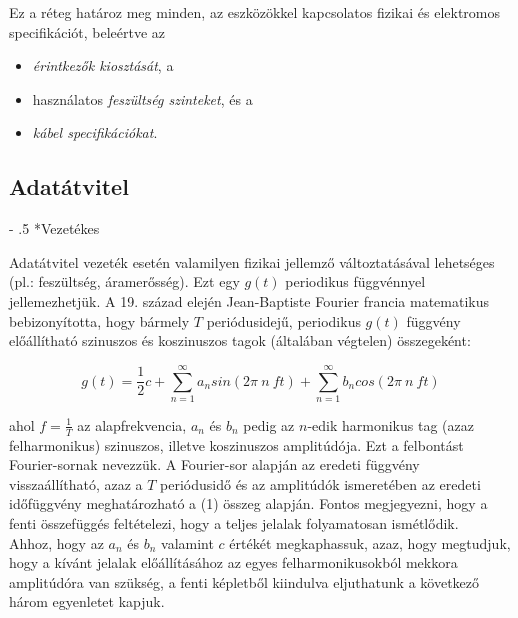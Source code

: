 \documentclass[12pt]{article}
\makeatletter
\renewcommand\paragraph{%
	\@startsection{paragraph}{4}{0mm}%
	{-\baselineskip}%
	{.5\baselineskip}%
	{\normalfont\normalsize\bfseries}}
\makeatother
\begin{document}
    \noindent Ez a réteg határoz meg minden, az eszközökkel kapcsolatos fizikai és elektromos specifikációt, beleértve az
    \begin{itemize}[leftmargin=7.5mm]
        \renewcommand{\labelitemi}{$\vcenter{\hbox{\tiny$\bullet$}}$}
        \item \emph{érintkezők kiosztását}, a
        \item használatos \emph{feszültség szinteket}, és a
        \item \emph{kábel specifikációkat}.
    \end{itemize}

	\subsection*{Adatátvitel\\}

	\paragraph*{Vezetékes}

    Adatátvitel vezeték esetén valamilyen fizikai jellemző változtatásával lehetséges (pl.: feszültség, áramerősség). Ezt egy $g(t)$ periodikus függvénnyel jellemezhetjük.
    A 19. század elején Jean-Baptiste Fourier francia matematikus bebizonyította, hogy bármely $T$ periódusidejű, periodikus $g(t)$ függvény előállítható szinuszos és koszinuszos tagok (általában végtelen) összegeként:
    \begin{mycapequ}[!ht]
    \label{ref:fourier}
        \begin{equation}
   		   g(t) = \frac{1}{2}c+ \sum\limits_{n=1}^\infty a_nsin(2\pi\ n\ f t) + \sum\limits_{n=1}^\infty b_ncos(2\pi\ n\ f t)
        \end{equation}
    \end{mycapequ}
			
    \noindent ahol $f=\frac{1}{T}$ az alapfrekvencia, $a_n$ és $b_n$ pedig az $n$-edik harmonikus tag (azaz felharmonikus) szinuszos, illetve koszinuszos amplitúdója. Ezt a felbontást Fourier-sornak nevezzük. A Fourier-sor alapján az eredeti függvény visszaállítható, azaz a $T$ periódusidő és az amplitúdók ismeretében az eredeti időfüggvény meghatározható a (1) összeg alapján. Fontos megjegyezni, hogy a fenti összefüggés feltételezi, hogy a teljes jelalak folyamatosan ismétlődik.\\
	
    \noindent Ahhoz,  hogy  az $a_n$ és $b_n$ valamint $c$ értékét  megkaphassuk,  azaz,  hogy  megtudjuk,  hogy  a kívánt   jelalak   előállításához   az   egyes   felharmonikusokból   mekkora   amplitúdóra   van szükség, a fenti képletből kiindulva eljuthatunk a következő három egyenletet kapjuk.
\end{document}
